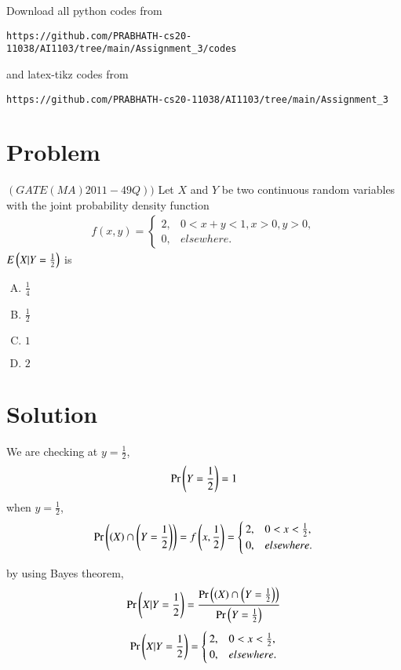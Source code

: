 \documentclass[journal,12pt,twocolumn]{IEEEtran}
\begin{document}
Download all python codes from 
\begin{lstlisting}
https://github.com/PRABHATH-cs20-11038/AI1103/tree/main/Assignment_3/codes
\end{lstlisting}

and latex-tikz codes from
\begin{lstlisting}
https://github.com/PRABHATH-cs20-11038/AI1103/tree/main/Assignment_3
\end{lstlisting}

\section{Problem}

$(GATE(MA) 2011-49Q))$ Let $X$ and $Y$ be two continuous random variables with the joint probability density function
\begin{align}
    f(x,y) =
    \begin{cases}
    2, & 0<x+y<1, x>0, y>0,\\
    0, & elsewhere.
    \end{cases}
\end{align}
$E\left(X | Y=\frac{1}{2}\right)$ is
\begin{enumerate}[(A)]
    \item $\frac{1}{4}$\\
    \item $\frac{1}{2}$\\
    \item $1$\\
    \item $2$
\end{enumerate}
\section{Solution}

We are checking at $y=\frac{1}{2}$,
\begin{align}
    \Pr\left(Y=\frac{1}{2}\right)=1
\end{align}
when $y=\frac{1}{2}$,
\begin{align}
    \Pr\left(\left(X\right)\cap\left(Y=\frac{1}{2}\right)\right)=f\left(x,\frac{1}{2}\right)=
    \begin{cases}
    2, & 0<x<\frac{1}{2},\\
    0, & elsewhere.
    \end{cases}
\end{align}

by using Bayes theorem,
\begin{align}
    \Pr\left(X | Y=\frac{1}{2}\right)=\frac{\Pr\left(\left(X\right)\cap\left(Y=\frac{1}{2}\right)\right)}{\Pr\left(Y=\frac{1}{2}\right)}
\end{align}
\begin{align}
    \Pr\left(X|Y=\frac{1}{2}\right)=
    \begin{cases}
    2, & 0<x<\frac{1}{2},\\
    0, & elsewhere.
    \end{cases}
\end{align}
\end{document}
